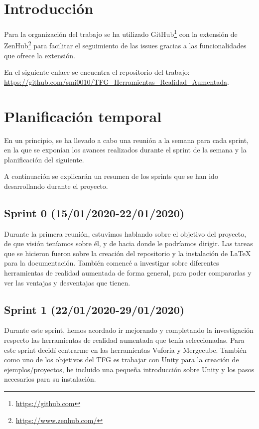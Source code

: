 
\section{Introducción}
 Para la organización del trabajo se ha utilizado GitHub\footnote{\url{https://github.com}} con la extensión de ZenHub\footnote{\url{https://www.zenhub.com/}} para facilitar el seguimiento de las issues gracias a las funcionalidades que ofrece la extensión.
 
En el siguiente enlace se encuentra el repositorio del trabajo: \url{https://github.com/smi0010/TFG_Herramientas_Realidad_Aumentada}.
\section{Planificación temporal}

En un principio, se ha llevado a cabo una reunión a la semana para cada sprint, en la que se exponían los avances realizados durante el sprint de la semana y la planificación del siguiente.

A continuación se explicarán un resumen de los sprints que se han ido desarrollando durante el proyecto.

\subsection{Sprint 0 (15/01/2020-22/01/2020)}
Durante la primera reunión, estuvimos hablando sobre el objetivo del proyecto, de que visión teníamos sobre él, y de hacia donde le podríamos dirigir.
Las tareas que se hicieron fueron sobre la creación del repositorio y la instalación de \LaTeX{} para la documentación. También comencé a investigar sobre diferentes herramientas de realidad aumentada de forma general, para poder compararlas y ver las ventajas y desventajas que tienen.

\subsection{Sprint 1 (22/01/2020-29/01/2020)}
Durante este sprint, hemos acordado ir mejorando y completando  la investigación respecto las herramientas de realidad aumentada que tenía seleccionadas.
Para este sprint decidí centrarme en las herramientas Vuforia y Mergecube.
También como uno de los objetivos del TFG es trabajar con Unity para la creación de ejemplos/proyectos, he incluido una pequeña introducción sobre Unity y los pasos necesarios para su instalación.
